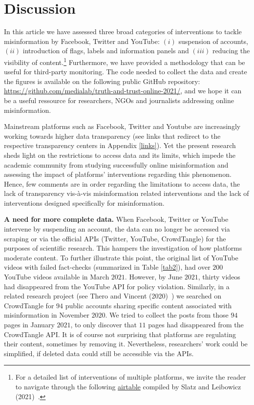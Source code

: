 \documentclass{article}
\begin{document}
\section{Discussion}

In this article we have assessed three broad categories of interventions to tackle misinformation by Facebook, Twitter and YouTube: $(i)$ suspension of accounts, $(ii)$ introduction of flags, labels and information panels and $(iii)$ reducing the visibility of content.\footnote{For a detailed list of interventions of multiple platforms, we invite the reader to navigate through the following \href{https://airtable.com/shrO0ooI9WSEfIUhb/tblAWQwFOiihKdQjm/viwZLAOzLK1NQ0c2n?blocks=hide}{airtable} compiled by Slatz and Leibowicz (2021)~\cite{niemanlab}.}
Furthermore, we have provided a methodology that can be useful for third-party monitoring. 
The code needed to collect the data and create the figures is available on the following public GitHub repository: \href{https://github.com/medialab/truth-and-trust-online-2021/}{https://github.com/medialab/truth-and-trust-online-2021/}, and we hope it can be a useful ressource for researchers, NGOs and journalists addressing online misinformation. 

\smallskip

Mainstream platforms such as Facebook, Twitter and Youtube are increasingly working towards higher data transparency (see links that redirect to the respective transparency centers in Appendix \ref{links}). 
Yet the present research sheds light on the restrictions to access data and its limits, which impede the academic community from studying successfully online misinformation and assessing the impact of platforms' interventions regarding this phenomenon. 
Hence, few comments are in order regarding the limitations to access data, the lack of transparency vis-\`{a}-vis misinformation related interventions and the lack of interventions designed specifically for misinformation. 

\smallskip

{\bf A need for more complete data.} 
When Facebook, Twitter or YouTube intervene by suspending an account, the data can no longer be accessed via scraping or via the official APIs (Twitter, YouTube, CrowdTangle) for the purposes of scientific research. 
This hampers the investigation of how platforms moderate content. 
To further illustrate this point, the original list of YouTube videos with failed fact-checks (summarized in Table \ref{tab2}), had over $200$ YouTube videos available in March $2021$. 
However, by June $2021$, thirty videos had disappeared from the YouTube API for policy violation. 
Similarly, in a related research project (see Thero and Vincent (2020)~\cite{therovincent}) we searched on CrowdTangle for $94$ public accounts sharing specific content associated with misinformation in November $2020$. 
We tried to collect the posts from those $94$ pages in January $2021$, to only discover that $11$ pages had disappeared from the CrowdTangle API.
It is of course not surprising that platforms are regulating their content, sometimes by removing it. 
Nevertheless, researchers' work could be simplified, if deleted data could still be accessible via the APIs.
\end{document}
